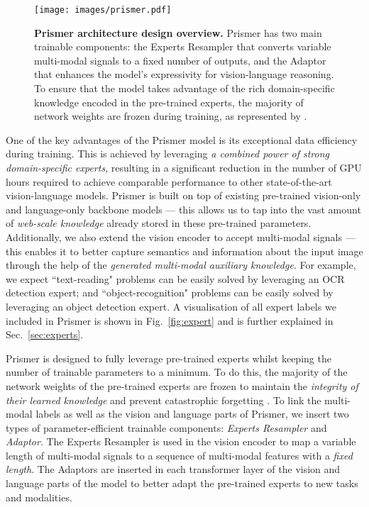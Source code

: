 \documentclass[11pt]{article}
\begin{document}
\begin{figure*}[t]
  \centering
  \texttt{[image: images/prismer.pdf]}
  \caption{{\bf Prismer architecture design overview.} Prismer has two main trainable components: the Experts Resampler that converts variable multi-modal signals to a fixed number of outputs, and the Adaptor that enhances the model's expressivity for vision-language reasoning. To ensure that the model takes advantage of the rich domain-specific knowledge encoded in the pre-trained experts, the majority of network weights are frozen during training, as represented by  {\footnotesize \SnowflakeChevron}. }
  \label{fig:prismer}  
\end{figure*}


One of the key advantages of the Prismer model is its exceptional data efficiency during training. This is achieved by leveraging {\it a combined power of strong domain-specific experts}, resulting in a significant reduction in the number of GPU hours required to achieve comparable performance to other state-of-the-art vision-language models.  Prismer is built on top of existing pre-trained vision-only and language-only backbone models --- this allows us to tap into the vast amount of  {\it web-scale knowledge} already stored in these pre-trained parameters. Additionally, we also extend the vision encoder to accept multi-modal signals --- this enables it to better capture semantics and information about the input image through the help of the {\it generated multi-modal auxiliary knowledge}. For example, we expect ``text-reading" problems can be easily solved by leveraging an OCR detection expert; and ``object-recognition" problems can be easily solved by leveraging an object detection expert. A visualisation of all expert labels we included in Prismer is shown in Fig.~\ref{fig:expert} and is further explained in Sec.~\ref{sec:experts}. 

Prismer is designed to fully leverage pre-trained experts whilst keeping the number of trainable parameters to a minimum. To do this, the majority of the network weights of the pre-trained experts are frozen to maintain the {\it integrity of their learned knowledge} and prevent catastrophic forgetting   \cite{kemker2018measuring,kirkpatrick2017overcoming_forgetting}. To link the multi-modal labels as well as the vision and language parts of Prismer, we insert two types of parameter-efficient trainable components: {\it Experts Resampler} and {\it Adaptor}. The Experts Resampler is used in the vision encoder to map a variable length of multi-modal signals to a sequence of multi-modal features with a {\it fixed length}. The Adaptors are inserted in each transformer layer of the vision and language parts of the model to better adapt the pre-trained experts to new tasks and modalities.
\end{document}
